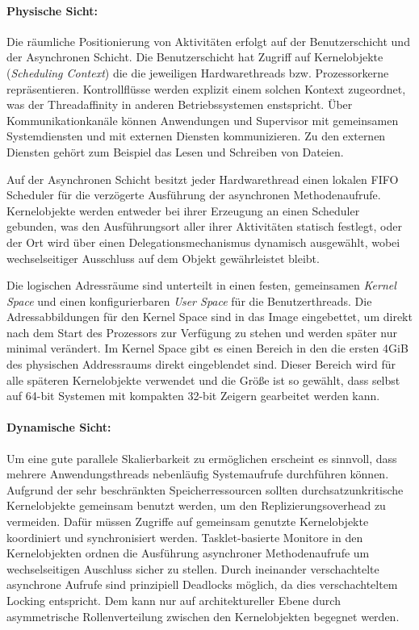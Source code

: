 \paragraph{Physische Sicht:}
Die räumliche Positionierung von Aktivitäten erfolgt auf der Benutzerschicht 
und der Asynchronen Schicht. Die Benutzerschicht hat Zugriff auf Kernelobjekte 
(\emph{Scheduling Context}) die die jeweiligen Hardwarethreads bzw. 
Prozessorkerne repräsentieren. Kontrollflüsse werden explizit einem solchen 
Kontext zugeordnet, was der Threadaffinity in anderen Betriebssystemen 
enstspricht. Über Kommunikationkanäle können Anwendungen und Supervisor mit 
gemeinsamen Systemdiensten und mit externen Diensten kommunizieren. Zu den 
externen Diensten gehört zum Beispiel das Lesen und Schreiben von Dateien. 

Auf der Asynchronen Schicht besitzt jeder Hardwarethread einen lokalen FIFO Scheduler für die verzögerte Ausführung der asynchronen Methodenaufrufe. Kernelobjekte werden entweder bei ihrer Erzeugung an einen Scheduler gebunden, was den Ausführungsort aller ihrer Aktivitäten statisch festlegt, oder der Ort wird über einen Delegationsmechanismus dynamisch ausgewählt, wobei wechselseitiger Ausschluss auf dem Objekt gewährleistet bleibt. 

Die logischen Adressräume sind unterteilt in einen festen, gemeinsamen 
\emph{Kernel Space} und einen konfigurierbaren \emph{User Space} für die 
Benutzerthreads. Die Adressabbildungen für den Kernel Space sind in das Image 
eingebettet, um direkt nach dem Start des Prozessors zur Verfügung zu stehen 
und werden später nur minimal verändert. Im Kernel Space gibt es einen Bereich 
in den die ersten 4GiB des physischen Addressraums direkt eingeblendet sind. 
Dieser Bereich wird für alle späteren Kernelobjekte verwendet und die Größe 
ist so gewählt, dass selbst auf 64-bit Systemen mit kompakten 32-bit Zeigern 
gearbeitet werden kann.

\paragraph{Dynamische Sicht:}
Um eine gute parallele Skalierbarkeit zu ermöglichen erscheint es sinnvoll, 
dass mehrere Anwendungsthreads nebenläufig Systemaufrufe durchführen können. 
Aufgrund der sehr beschränkten Speicherressourcen sollten durchsatzunkritische 
Kernelobjekte gemeinsam benutzt werden, um den Replizierungsoverhead zu 
vermeiden. Dafür müssen Zugriffe auf gemeinsam genutzte Kernelobjekte 
koordiniert und synchronisiert werden. Tasklet-basierte Monitore in den
Kernelobjekten ordnen die Ausführung asynchroner Methodenaufrufe um
wechselseitigen Auschluss sicher zu stellen. Durch ineinander verschachtelte
asynchrone Aufrufe sind prinzipiell Deadlocks möglich, da dies verschachteltem
Locking entspricht. 
Dem kann nur auf architektureller Ebene durch asymmetrische Rollenverteilung 
zwischen den Kernelobjekten begegnet werden.  

